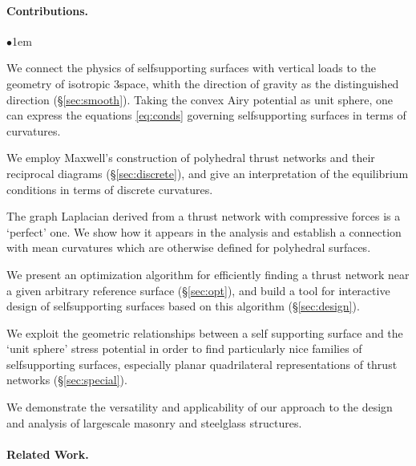 \documentclass[annual]{acmsiggraph}
\newcommand{\secref}[1]{(\S\ref{#1})}
\begin{document}
\paragraph{Contributions.}

\begin{list}{$\bullet$}{\itemindent1em}

\item We connect the physics of self\dash supporting surfaces with
vertical loads to the geometry of isotropic 3\dash space, whith the
direction of gravity as the distinguished direction
\secref{sec:smooth}. Taking the convex Airy potential as
unit sphere, one can express the equations  \eqref{eq:conds}
governing self\dash supporting surfaces in terms of curvatures.

\item We employ Maxwell's construction of polyhedral thrust networks
and their reciprocal diagrams \secref{sec:discrete}, and give
an interpretation of the equilibrium conditions in terms of
discrete curvatures.

\item The graph Laplacian derived from a thrust network with compressive
forces is a `perfect' one. We show how it appears in the analysis and
establish a connection with mean curvatures which are otherwise defined
for polyhedral surfaces.

\item We present an optimization algorithm for efficiently finding
a thrust network near a given arbitrary reference surface \secref{sec:opt},
and build a tool for interactive design of self\dash supporting surfaces based
on this algorithm \secref{sec:design}.

\item We exploit the geometric relationships between a self\dash
supporting surface and the `unit sphere' stress potential in order
to find  particularly nice families of self\dash supporting surfaces,
especially planar quadrilateral representations  of thrust networks
\secref{sec:special}.

\item We demonstrate the versatility and applicability of
our approach to the design and analysis of large\dash scale masonry and
steel\dash glass structures.

\end{list}

\paragraph{Related Work.}
\end{document}
